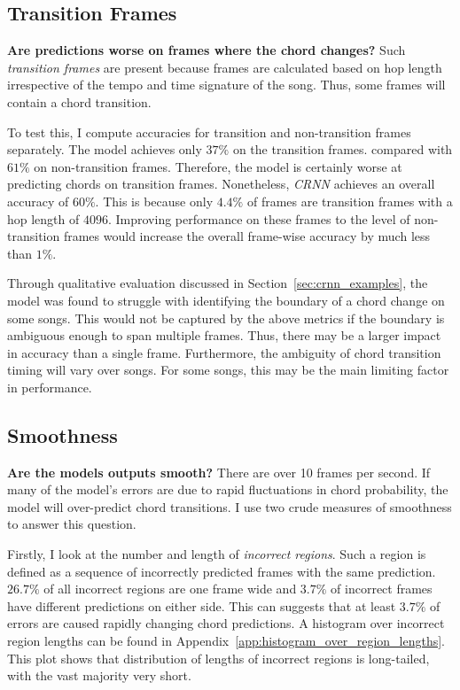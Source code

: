 \subsection{Transition Frames}\label{sec:transition_frames}

\textbf{Are predictions worse on frames where the chord changes?} Such \emph{transition frames} are present because frames are calculated based on hop length irrespective of the tempo and time signature of the song. Thus, some frames will contain a chord transition. 

To test this, I compute accuracies for transition and non-transition frames separately. The model achieves only $37\%$ on the transition frames. compared with $61\%$ on non-transition frames. Therefore, the model is certainly worse at predicting chords on transition frames. Nonetheless, \emph{CRNN} achieves an overall accuracy of $60\%$. This is because only $4.4\%$ of frames are transition frames with a hop length of $4096$. Improving performance on these frames to the level of non-transition frames would increase the overall frame-wise accuracy by much less than $1\%$. 

Through qualitative evaluation discussed in Section~\ref{sec:crnn_examples}, the model was found to struggle with identifying the boundary of a chord change on some songs. This would not be captured by the above metrics if the boundary is ambiguous enough to span multiple frames. Thus, there may be a larger impact in accuracy than a single frame. Furthermore, the ambiguity of chord transition timing will vary over songs. For some songs, this may be the main limiting factor in performance.

\subsection{Smoothness}\label{sec:smoothness}

\textbf{Are the models outputs smooth?} There are over 10 frames per second. If many of the model's errors are due to rapid fluctuations in chord probability, the model will over-predict chord transitions. I use two crude measures of smoothness to answer this question.

Firstly, I look at the number and length of \emph{incorrect regions}. Such a region is defined as a sequence of incorrectly predicted frames with the same prediction. $26.7\%$ of all incorrect regions are one frame wide and $3.7\%$ of incorrect frames have different predictions on either side. This can suggests that at least $3.7\%$ of errors are caused rapidly changing chord predictions. A histogram over incorrect region lengths can be found in Appendix~\ref{app:histogram_over_region_lengths}. This plot shows that distribution of lengths of incorrect regions is long-tailed, with the vast majority very short.

